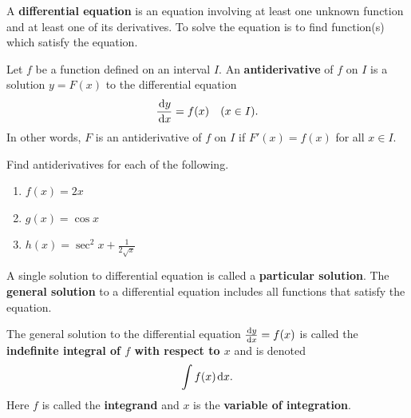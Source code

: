 \setcounter{chapter}{4}
\setcounter{section}{7}
\setcounter{theorem}{0}
\setcounter{equation}{0}


\begin{definition}
A \textbf{differential equation} is an equation involving at least one unknown function and at least one of its derivatives.
To solve the equation is to find function(s) which satisfy the equation.
\end{definition}

\begin{definition}
Let $f$ be a function defined on an interval $I$.
An \textbf{antiderivative} of $f$ on $I$ is a solution $y=F(x)$ to the differential equation
\begin{equation*}\label{antiderivative DE}
\frac{\mkern 2mu \mathrm{d} y}{\mkern 2mu \mathrm{d} x} = f(x)\quad (x\in I).
\end{equation*}
In other words, $F$ is an antiderivative of $f$ on $I$ if $F'(x)=f(x)$ for all $x\in I$.
\end{definition}


\begin{example}
Find antiderivatives for each of the following.
\begin{enumerate}
\item $f(x) = 2x$
\vfill
\item $g(x) =\cos x$
\vfill
\item $h(x) =\sec^2 x + \frac{1}{2\sqrt x}$
\vfill
\end{enumerate}
\end{example}

\newpage

\begin{definition}
A single solution to differential equation is called a \textbf{particular solution}.
The \textbf{general solution} to a differential equation includes all functions that satisfy the equation.
\end{definition}

\begin{definition}
The general solution to the differential equation $\frac{\mkern 2mu \mathrm{d} y}{\mkern 2mu \mathrm{d} x}=f(x)$ is called the \textbf{indefinite integral of $f$ with respect to $x$} and is denoted
\begin{equation*}
\int f(x)\mkern 2mu \mathrm{d} x.
\end{equation*}
Here $f$ is called the \textbf{integrand} and $x$ is the \textbf{variable of integration}.
\end{definition}

